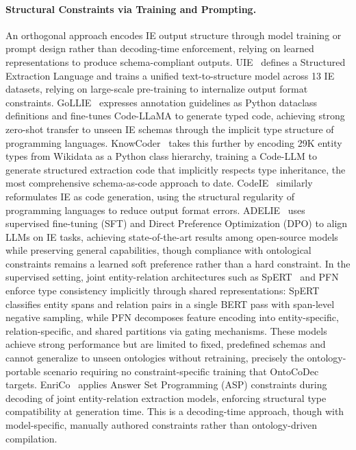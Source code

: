 \paragraph{Structural Constraints via Training and Prompting.}
An orthogonal approach encodes IE output structure through model training or prompt design rather than decoding-time enforcement, relying on learned representations to produce schema-compliant outputs.
UIE~\cite{lu2022uie} defines a Structured Extraction Language and trains a unified text-to-structure model across 13 IE datasets, relying on large-scale pre-training to internalize output format constraints.
GoLLIE~\cite{sainz2024gollie} expresses annotation guidelines as Python dataclass definitions and fine-tunes Code-LLaMA to generate typed code, achieving strong zero-shot transfer to unseen IE schemas through the implicit type structure of programming languages.
KnowCoder~\cite{knowcoder_acl2024} takes this further by encoding 29K entity types from Wikidata as a Python class hierarchy, training a Code-LLM to generate structured extraction code that implicitly respects type inheritance, the most comprehensive schema-as-code approach to date.
CodeIE~\cite{li2023codeie} similarly reformulates IE as code generation, using the structural regularity of programming languages to reduce output format errors.
ADELIE~\cite{qi2024adelie} uses supervised fine-tuning (SFT) and Direct Preference Optimization (DPO) to align LLMs on IE tasks, achieving state-of-the-art results among open-source models while preserving general capabilities, though compliance with ontological constraints remains a learned soft preference rather than a hard constraint.
In the supervised setting, joint entity-relation architectures such as SpERT~\cite{eberts2020spert} and PFN~\cite{yan2021pfn} enforce type consistency implicitly through shared representations: SpERT classifies entity spans and relation pairs in a single BERT pass with span-level negative sampling, while PFN decomposes feature encoding into entity-specific, relation-specific, and shared partitions via gating mechanisms.
These models achieve strong performance but are limited to fixed, predefined schemas and cannot generalize to unseen ontologies without retraining, precisely the ontology-portable scenario requiring no constraint-specific training that OntoCoDec targets.
EnriCo~\cite{zaratiana2024enrico} applies Answer Set Programming (ASP) constraints during decoding of joint entity-relation extraction models, enforcing structural type compatibility at generation time. This is a decoding-time approach, though with model-specific, manually authored constraints rather than ontology-driven compilation.
